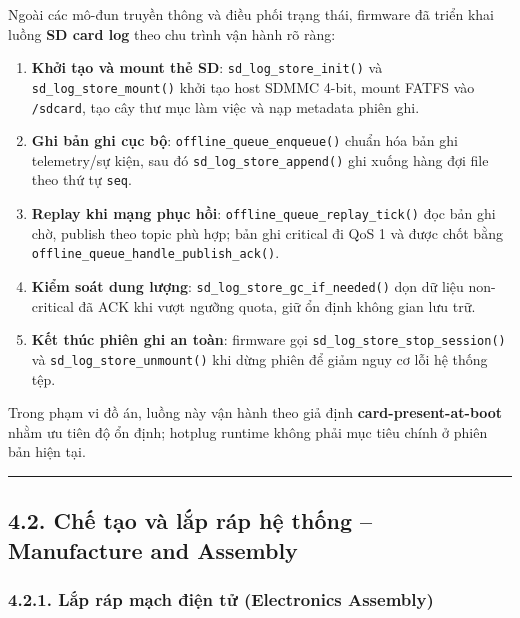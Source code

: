 \documentclass[13pt,a4paper]{extarticle}
\renewcommand{\\}{\thesislongtableorignewline\hline}%
\providecommand{\tightlist}{%
  \setlength{\itemsep}{0pt}\setlength{\parskip}{0pt}}
\begin{document}
Ngoài các mô-đun truyền thông và điều phối trạng thái, firmware đã triển
khai luồng \textbf{SD card log} theo chu trình vận hành rõ ràng:

\begin{enumerate}
\def\labelenumi{\arabic{enumi}.}
\tightlist
\item
  \textbf{Khởi tạo và mount thẻ SD}: \texttt{sd\_log\_store\_init()} và
  \texttt{sd\_log\_store\_mount()} khởi tạo host SDMMC 4-bit, mount
  FATFS vào \texttt{/sdcard}, tạo cây thư mục làm việc và nạp metadata
  phiên ghi.
\item
  \textbf{Ghi bản ghi cục bộ}: \texttt{offline\_queue\_enqueue()} chuẩn
  hóa bản ghi telemetry/sự kiện, sau đó
  \texttt{sd\_log\_store\_append()} ghi xuống hàng đợi file theo thứ tự
  \texttt{seq}.
\item
  \textbf{Replay khi mạng phục hồi}:
  \texttt{offline\_queue\_replay\_tick()} đọc bản ghi chờ, publish theo
  topic phù hợp; bản ghi critical đi QoS 1 và được chốt bằng
  \texttt{offline\_queue\_handle\_publish\_ack()}.
\item
  \textbf{Kiểm soát dung lượng}:
  \texttt{sd\_log\_store\_gc\_if\_needed()} dọn dữ liệu non-critical đã
  ACK khi vượt ngưỡng quota, giữ ổn định không gian lưu trữ.
\item
  \textbf{Kết thúc phiên ghi an toàn}: firmware gọi
  \texttt{sd\_log\_store\_stop\_session()} và
  \texttt{sd\_log\_store\_unmount()} khi dừng phiên để giảm nguy cơ lỗi
  hệ thống tệp.
\end{enumerate}

Trong phạm vi đồ án, luồng này vận hành theo giả định
\textbf{card-present-at-boot} nhằm ưu tiên độ ổn định; hotplug runtime
không phải mục tiêu chính ở phiên bản hiện tại.

\begin{center}\rule{0.5\linewidth}{0.5pt}\end{center}

\subsection{4.2. Chế tạo và lắp ráp hệ thống -- Manufacture and
Assembly}\label{42-chux1ebf-tux1ea1o-vuxe0-lux1eafp-ruxe1p-hux1ec7-thux1ed1ng--manufacture-and-assembly}

\subsubsection{4.2.1. Lắp ráp mạch điện tử (Electronics
Assembly)}\label{421-lux1eafp-ruxe1p-mux1ea1ch-ux111iux1ec7n-tux1eed-electronics-assembly}
\end{document}
